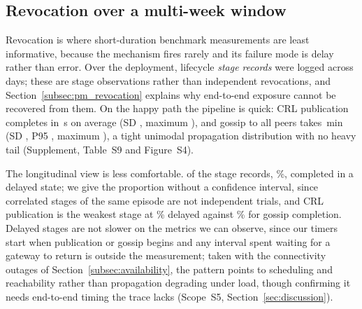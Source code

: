 \documentclass[a4paper,fleqn]{cas-dc}
\begin{document}
\subsection{Revocation over a multi-week window}
\label{subsec:revocation}

Revocation is where short-duration benchmark measurements are least
informative, because the mechanism fires rarely and its failure mode is
delay rather than error.
Over the deployment, \RevEvents{} lifecycle \emph{stage records} were
logged across \RevDays{} days; these are stage observations rather than
independent revocations, and Section~\ref{subsec:pm_revocation} explains
why end-to-end exposure cannot be recovered from them. On the happy path
the pipeline is quick: CRL publication completes in \RevPubMean\,s on
average (SD \RevPubSD, maximum \RevPubMax), and gossip to all peers takes
\RevGossipMean\,min (SD \RevGossipSD, P95 \RevGossipPNinetyFive, maximum
\RevGossipMax), a tight unimodal propagation distribution with no heavy
tail (Supplement, Table~S9 and Figure~S4).

The longitudinal view is less comfortable. \RevDelayed{} of the
\RevEvents{} stage records, \RevDelayedPct\%, completed in a delayed
state; we give the proportion without a confidence interval, since
correlated stages of the same episode are not independent trials, and CRL
publication is the weakest stage at \RevWorstTypePct\% delayed against
\RevBestTypePct\% for gossip completion. Delayed stages are not slower on
the metrics we can observe, since our timers start when publication or
gossip begins and any interval spent waiting for a gateway to return is
outside the measurement; taken with the connectivity outages of
Section~\ref{subsec:availability}, the pattern points to scheduling and
reachability rather than propagation degrading under load, though
confirming it needs end-to-end timing the trace lacks (Scope~S5,
Section~\ref{sec:discussion}).
\end{document}

